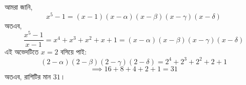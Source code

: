 \documentclass[12pt, a4paper]{article}
\begin{document}
\begin{tcolorbox}[solutionbox={সমাধান (Solution)}]
    \noindent
    আমরা জানি, 
    \[ x^5 - 1 = (x-1)(x-\alpha)(x-\beta)(x-\gamma)(x-\delta) \]
    অতএব, 
    \[ \frac{x^5 - 1}{x - 1} = x^4 + x^3 + x^2 + x + 1 = (x-\alpha)(x-\beta)(x-\gamma)(x-\delta) \]
    এই অভেদটিতে $x = 2$ বসিয়ে পাই:
    \[ (2-\alpha)(2-\beta)(2-\gamma)(2-\delta) = 2^4 + 2^3 + 2^2 + 2 + 1 \]
    \[ \implies 16 + 8 + 4 + 2 + 1 = 31 \]
    অতএব, রাশিটির মান $31$।
\end{tcolorbox}
\end{document}
